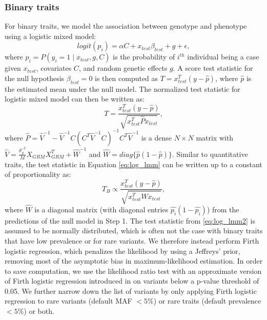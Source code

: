 \subsubsection{Binary traits}
%
For binary traits, we model the association between genotype and phenotype using a logistic mixed model:
\begin{equation}
    logit(p_i) = \alpha C + x_{test}\beta_{test} + g + \epsilon, \label{eq:log_lmm}
\end{equation}
where $p_i = P(y_i = 1 \mid x_{test}, g, C)$ is the probability of $i^{th}$ individual being a case given $x_{test}$, covariates $C$, and random genetic effects $g$.
%
A score test statistic for the null hypothesis $\beta_{test} = 0$ is then computed as $T = x_{test}^T(y - \hat{p})$, where $\hat{p}$ is the estimated mean under the null model.
%
The normalized test statistic for logistic mixed model can then be written as: 
\begin{equation}
    T = \frac{x_{test}^T(y - \hat{p})}{\sqrt{x_{test}^T\hat{P}x_{test}}},
\label{eq:log_lmm1}
\end{equation}
where $\hat{P} = \hat{V}^{-1} - \hat{V}^{-1} C(C^T\hat{V}^{-1}C)^{-1}C^T\hat{V}^{-1}$ is a dense $N \times N$ matrix with $\hat{V} = \frac{\hat{\sigma_g}^2}{M} X_{GRM}X_{GRM}^T + \hat{W}^{-1}$ and $\hat{W} = diag\{ \hat{p} (1-\hat{p}) \}$.
%
Similar to quantitative traits, the test statistic in Equation \ref{eq:log_lmm} can be written up to a constant of proportionality \cite{zhou2018efficiently} as:
\begin{equation}
    T_{B} \propto \frac{x_{test}^T(y - \hat{p})}{\sqrt{x_{test}^T\hat{W}x_{test}}},
\label{eq:log_lmm2}
\end{equation}
where $\hat{W}$ is a diagonal matrix (with diagonal entries $\hat{p_i} (1-\hat{p_i})$) from the predictions of the null model in Step 1.
%
The test statistic from \ref{eq:log_lmm2} is assumed to be normally distributed, which is often not the case with binary traits that have low prevalence or for rare variants.
%
We therefore instead perform Firth logistic regression, which penalizes the likelihood by using a Jeffreys' prior, removing most of the asymptotic bias in maximum-likelihood estimation.
%
In order to save computation, we use the likelihood ratio test with an approximate version of Firth logistic regression introduced in \cite{mbatchou2021computationally} on variants below a p-value threshold of 0.05. 
%
We further narrow down the list of variants by only applying Firth logistic regression to rare variants (default MAF $< 5\%$) or rare traits (default prevalence $< 5\%$) or both.

